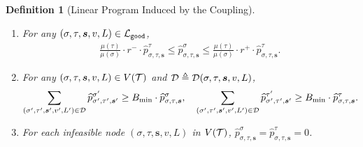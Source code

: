 \documentclass[11pt]{article}
\newtheorem{definition}[theorem]{Definition}
\def\!#1{\mathtt{#1}}
\newcommand{\seqS}{\boldsymbol{s}}
\begin{document}
\begin{definition}[Linear Program Induced by the Coupling]
{\begin{enumerate}
\begin{align}
            \end{align}
            \begin{align}\label{eqn-hat-inner-child-sum2}
                \widehat{p}^{\tau}_{\sigma,\tau, \seqS,e}=\widehat{p}^{\tau\land (e\gets 0)}_{\sigma\land (e\gets 0),\tau\land (e\gets 0), \seqS\circ e}+\widehat{p}^{\tau\land (e\gets 0)}_{\sigma\land (e\gets 1),\tau\land (e\gets 0), \seqS \circ e}, \quad  \widehat{p}^{\tau}_{\sigma,\tau,\seqS,e}=\widehat{p}^{\tau\land (e\gets 1)}_{\sigma\land (e\gets 1),\tau\land (e\gets 1),\seqS\circ e}.
            \end{align}
            Otherwise, 
            \begin{align}\label{eqn-hat-inner-child-sum3}
                 \widehat{p}^{\sigma}_{\sigma,\tau,\seqS,e}= \widehat{p}^{\sigma \land (e\gets 0)}_{\sigma\land (e\gets 0),\tau\land (e\gets 0),\seqS\circ e}+ \widehat{p}^{\sigma\land (e\gets 0)}_{\sigma\land (e\gets 0),\tau\land (e\gets 1), \seqS\circ e}, \quad  \widehat{p}^{\sigma}_{\sigma,\tau,\seqS,e}=\widehat{p}^{\sigma\land (e\gets 1)}_{\sigma\land (e\gets 1),\tau\land (e\gets 1), \seqS\circ e},
            \end{align}
            \begin{align}\label{eqn-hat-inner-child-sum4}
                 \widehat{p}^{\tau}_{\sigma,\tau,\seqS,e}= \widehat{p}^{\tau\land (e\gets 0)}_{\sigma\land (e\gets 0),\tau\land (e\gets 0),\seqS\circ e}, \quad   \widehat{p}^{\tau}_{\sigma,\tau,\seqS,e}= \widehat{p}^{\tau\land (e\gets 1)}_{\sigma\land (e\gets 0),\tau\land (e\gets 1),\seqS\circ e} +  \widehat{p}^{\tau \land (e\gets 1)}_{\sigma\land (e\gets 1),\tau\land (e\gets 1),\seqS\circ e}.
            \end{align}
        \item For any $(\sigma,\tau,\seqS,v,L)\in \+L_{\!{good}}$,
            \begin{align}\label{eqn-hat-ratio}
                 \frac{ \mu(\tau)}{ \mu(\sigma)}\cdot r^-\cdot {\widehat{p}^{\tau}_{\sigma,\tau, \seqS}}\leq {\widehat{p}^{\sigma}_{\sigma,\tau, \seqS}}\leq  \frac{ \mu(\tau)}{ \mu(\sigma)}\cdot  r^+ \cdot{\widehat{p}^{\tau}_{\sigma,\tau, \seqS}}.
            \end{align}
        \item For any $(\sigma,\tau, \seqS,v,L)\in V(\+T)$ and $\+D \triangleq \+D(\sigma,\tau, \seqS,v,L)$,
           \begin{align}\label{eqn-hat-error-bound}
               \sum_{(\sigma',\tau',\seqS',v',L')\in \+D}\widehat{p}^{\sigma'}_{\sigma',\tau', \seqS'} \geq  B_{\min} \cdot \widehat{p}^{\sigma}_{\sigma,\tau, \seqS}, \quad \sum_{(\sigma',\tau',\seqS',v',L')\in \+D}\widehat{p}^{\tau'}_{\sigma',\tau',\seqS'}\geq  B_{\min} \cdot \widehat{p}^{\tau}_{\sigma,\tau,\seqS}.
           \end{align}
        \item  For each infeasible node $(\sigma, \tau, \seqS, v, L)$ in $V(\mathcal{T})$, $ \widehat{p}^{\sigma}_{\sigma,\tau, \seqS}= \widehat{p}^{\tau}_{\sigma,\tau, \seqS}=0$. 
    \end{enumerate}
}
\end{definition}
\end{document}

